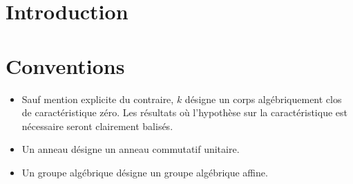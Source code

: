 
\chapter*{Introduction}



\chapter*{Conventions}
\label{sec:conventions}

\begin{itemize}
\item Sauf mention explicite du contraire, $k$ désigne un corps algébriquement clos de caractéristique zéro. Les résultats où l'hypothèse sur la caractéristique est nécessaire seront clairement balisés.
\item Un anneau désigne un anneau commutatif unitaire.
\item Un groupe algébrique désigne un groupe algébrique affine.
\end{itemize}


